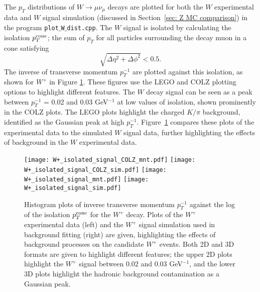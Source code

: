 \documentclass[a4paper,12pt]{article}
\begin{document}
The $p_T$ distributions of $W \xrightarrow{} \mu \nu_\mu$ decays are plotted for both the $W$ experimental data and $W$ signal simulation (discussed in Section~\ref{sec: Z MC comparison}) in the program \texttt{plot$\_$W$\_$dist.cpp}. 
The $W$ signal is isolated by calculating the isolation $p_T^{\rm cone}$; the sum of $p_T$ for all particles surrounding the decay muon in a cone satisfying
\begin{equation}
    \sqrt{\Delta\eta^2 + \Delta\phi^2} < 0.5.
    \label{eq: isolation}
\end{equation}
The inverse of transverse momentum $p_T^{-1}$ are plotted against this isolation, as shown for $W^+$ in Figure \ref{fig: isolation plots}. These figures use the LEGO and COLZ plotting options to highlight different features.
The $W$ decay signal can be seen as a peak between $p_T^{-1}$ = 0.02 and 0.03 GeV$^{-1}$ at low values of isolation, shown prominently in the COLZ plots. The LEGO plots highlight the charged $K/\pi$ background, identified as the Gaussian peak at high $p_T^{-1}$.
Figure~\ref{fig: isolation plots} compares these plots of the experimental data to the simulated $W$ signal data, further highlighting the effects of background in the $W$ experimental data.

\begin{figure*}[t]
\centering
\texttt{[image: W+\_isolated\_signal\_COLZ\_mnt.pdf]} %
\texttt{[image: W+\_isolated\_signal\_COLZ\_sim.pdf]}
\texttt{[image: W+\_isolated\_signal\_mnt.pdf]}
\texttt{[image: W+\_isolated\_signal\_sim.pdf]}
\vspace{-4mm}
\caption{\small Histogram plots of inverse transverse momentum $p_T^{-1}$ against the log of the isolation $p_T^{\rm cone}$ for the $W^+$ decay. 
Plots of the $W^+$ experimental data (left) and the $W^+$ signal simulation used in background fitting (right) are given, highlighting the effects of background processes on the candidate $W^+$ events.
Both 2D and 3D formats are given to highlight different features; the upper 2D plots highlight the $W^+$ signal between 0.02 and 0.03 GeV$^{-1}$, and the lower 3D plots highlight the hadronic background contamination as a Gaussian peak.}
\label{fig: isolation plots}
\end{figure*}

\end{document}
